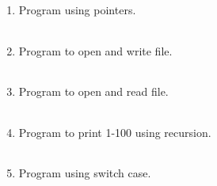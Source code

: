 \documentclass{exam}
\begin{document}
\begin{enumerate}
   \item  Program  using pointers.

   \begin{myTableStyle}
   \begin{center} \begin{tabular}{ |m{14cm}| } \hline
              \\ \hline
    \end{tabular} \end{center}
\end{myTableStyle}
  \pagebreak

   \item  Program  to open and write file.

   \begin{myTableStyle}
   \begin{center} \begin{tabular}{ |m{14cm}| } \hline
              \\ \hline
    \end{tabular} \end{center}
\end{myTableStyle}
  \pagebreak

   \item  Program  to open and read file.

   \begin{myTableStyle}
   \begin{center} \begin{tabular}{ |m{14cm}| } \hline
              \\ \hline
    \end{tabular} \end{center}
\end{myTableStyle}
  \pagebreak

   \item  Program  to print 1-100 using recursion.

   \begin{myTableStyle}
   \begin{center} \begin{tabular}{ |m{14cm}| } \hline
              \\ \hline
    \end{tabular} \end{center}
\end{myTableStyle}
  \pagebreak

   \item  Program  using switch case.

   \begin{myTableStyle}
   \begin{center} \begin{tabular}{ |m{14cm}| } \hline
              \\ \hline
    \end{tabular} \end{center}
\end{myTableStyle}



  \end{enumerate}
\end{document}
